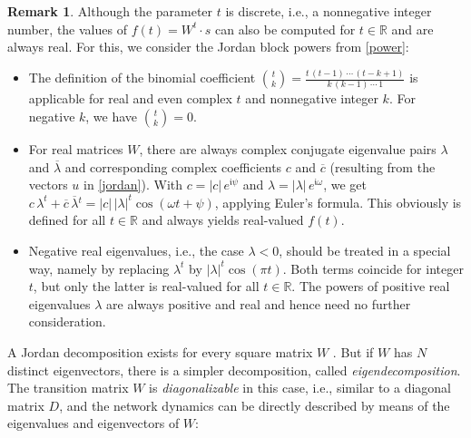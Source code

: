 \documentclass[twoside,11pt]{article}
\theoremstyle{definition}
\newtheorem{remk}{Remark}
\begin{document}
\begin{remk}\label{general}
Although the parameter $t$ is discrete, i.e., a nonnegative integer number, the
values of $f(t) = W^t \cdot s$ can also be computed for $t \in \mathbb{R}$ and
are always real. For this, we consider the Jordan block powers from \cref{power}:
\begin{itemize}
  \item The definition of the binomial coefficient $\binom{t}{k} =
	\frac{t\,(t-1)\,\cdots\,(t-k+1)}{k\,(k-1)\,\cdots\,1}$ is applicable for
	real and even complex $t$ and nonnegative integer $k$. For negative $k$,
	we have $\binom{t}{k} = 0$.
  \item For real matrices $W$, there are always complex conjugate eigenvalue
	pairs $\lambda$ and $\overline{\lambda}$ and corresponding complex
	coefficients $c$ and $\overline{c}$ (resulting from the vectors $u$ in
	\cref{jordan}). With $c = |c|\,e^{\mathfrak{i}\psi}$ and
	$\lambda = |\lambda|\,e^{\mathfrak{i}\omega}$, we get $c\,\lambda^t +
	\overline{c}\,\overline{\lambda}{}^t = |c|\,|\lambda|^t \cos(\omega
	t+\psi)$, applying Euler's formula. This obviously is defined for all
	$t \in \mathbb{R}$ and always yields real-valued $f(t)$.
  \item Negative real eigenvalues, i.e., the case $\lambda<0$, should be treated
	in a special way, namely by replacing $\lambda^t$ by $|\lambda|^t \cos(\pi t)$.
	Both terms coincide for integer $t$, but only the latter is real-valued
	for all $t \in \mathbb{R}$. The powers of positive real eigenvalues
	$\lambda$ are always positive and real and hence need no further consideration.
\end{itemize}
\end{remk}

A Jordan decomposition exists for every square matrix $W$ \citep[Theorem~3.1.11]{HJ13}.
But if $W$ has $N$ distinct eigenvectors, there is a simpler decomposition,
called \emph{eigendecomposition}. The transition matrix $W$ is
\emph{diagonalizable} in this case, i.e., similar to a diagonal matrix $D$, and
the network dynamics can be directly described by means of the eigenvalues and
eigenvectors of $W$:
\end{document}
